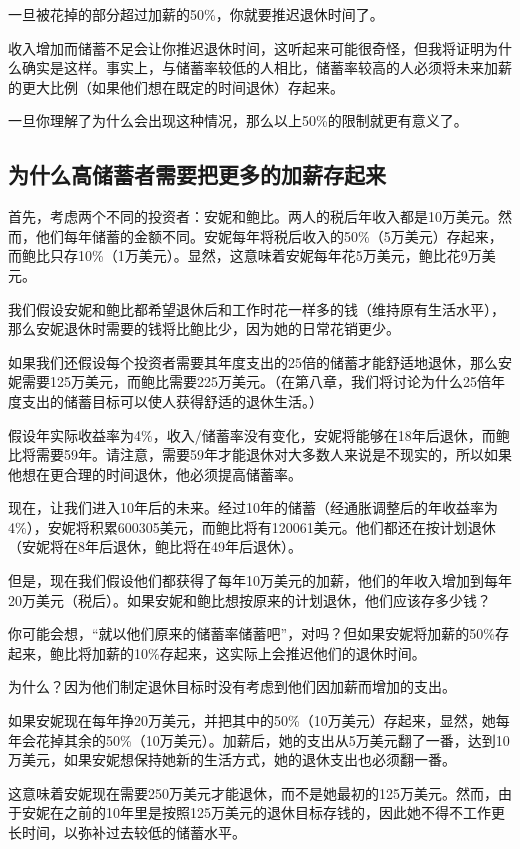 一旦被花掉的部分超过加薪的50\%，你就要推迟退休时间了。

收入增加而储蓄不足会让你推迟退休时间，这听起来可能很奇怪，但我将证明为什么确实是这样。事实上，与储蓄率较低的人相比，储蓄率较高的人必须将未来加薪的更大比例（如果他们想在既定的时间退休）存起来。

一旦你理解了为什么会出现这种情况，那么以上50\%的限制就更有意义了。

\subsection{为什么高储蓄者需要把更多的加薪存起来}
首先，考虑两个不同的投资者：安妮和鲍比。两人的税后年收入都是10万美元。然而，他们每年储蓄的金额不同。安妮每年将税后收入的50\%（5万美元）存起来，而鲍比只存10\%（1万美元）。显然，这意味着安妮每年花5万美元，鲍比花9万美元。

我们假设安妮和鲍比都希望退休后和工作时花一样多的钱（维持原有生活水平），那么安妮退休时需要的钱将比鲍比少，因为她的日常花销更少。

如果我们还假设每个投资者需要其年度支出的25倍的储蓄才能舒适地退休，那么安妮需要125万美元，而鲍比需要225万美元。（在第八章，我们将讨论为什么25倍年度支出的储蓄目标可以使人获得舒适的退休生活。）

假设年实际收益率为4\%，收入/储蓄率没有变化，安妮将能够在18年后退休，而鲍比将需要59年。请注意，需要59年才能退休对大多数人来说是不现实的，所以如果他想在更合理的时间退休，他必须提高储蓄率。

现在，让我们进入10年后的未来。经过10年的储蓄（经通胀调整后的年收益率为4\%），安妮将积累600305美元，而鲍比将有120061美元。他们都还在按计划退休（安妮将在8年后退休，鲍比将在49年后退休）。

但是，现在我们假设他们都获得了每年10万美元的加薪，他们的年收入增加到每年20万美元（税后）。如果安妮和鲍比想按原来的计划退休，他们应该存多少钱？

你可能会想，“就以他们原来的储蓄率储蓄吧”，对吗？但如果安妮将加薪的50\%存起来，鲍比将加薪的10\%存起来，这实际上会推迟他们的退休时间。

为什么？因为他们制定退休目标时没有考虑到他们因加薪而增加的支出。

如果安妮现在每年挣20万美元，并把其中的50\%（10万美元）存起来，显然，她每年会花掉其余的50\%（10万美元）。加薪后，她的支出从5万美元翻了一番，达到10万美元，如果安妮想保持她新的生活方式，她的退休支出也必须翻一番。

这意味着安妮现在需要250万美元才能退休，而不是她最初的125万美元。然而，由于安妮在之前的10年里是按照125万美元的退休目标存钱的，因此她不得不工作更长时间，以弥补过去较低的储蓄水平。

